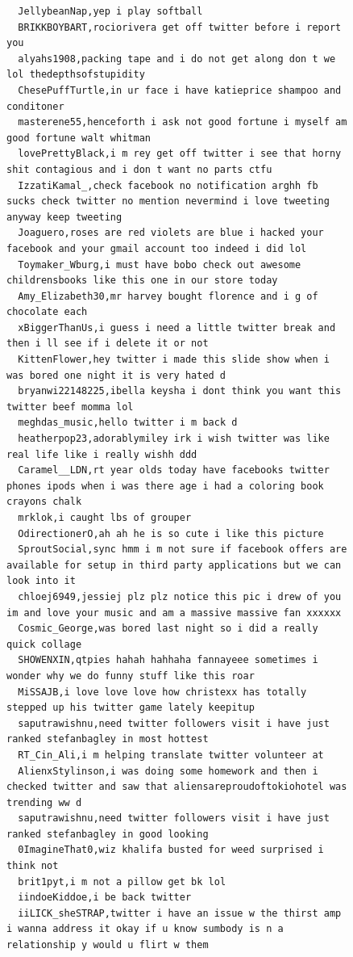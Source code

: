 \begin{figure}[htpb]
\begin{verbatim}
  JellybeanNap,yep i play softball
  BRIKKBOYBART,rociorivera get off twitter before i report you
  alyahs1908,packing tape and i do not get along don t we lol thedepthsofstupidity
  ChesePuffTurtle,in ur face i have katieprice shampoo and conditoner
  masterene55,henceforth i ask not good fortune i myself am good fortune walt whitman
  lovePrettyBlack,i m rey get off twitter i see that horny shit contagious and i don t want no parts ctfu
  IzzatiKamal_,check facebook no notification arghh fb sucks check twitter no mention nevermind i love tweeting anyway keep tweeting
  Joaguero,roses are red violets are blue i hacked your facebook and your gmail account too indeed i did lol
  Toymaker_Wburg,i must have bobo check out awesome childrensbooks like this one in our store today
  Amy_Elizabeth30,mr harvey bought florence and i g of chocolate each
  xBiggerThanUs,i guess i need a little twitter break and then i ll see if i delete it or not
  KittenFlower,hey twitter i made this slide show when i was bored one night it is very hated d
  bryanwi22148225,ibella keysha i dont think you want this twitter beef momma lol
  meghdas_music,hello twitter i m back d
  heatherpop23,adorablymiley irk i wish twitter was like real life like i really wishh ddd
  Caramel__LDN,rt year olds today have facebooks twitter phones ipods when i was there age i had a coloring book crayons chalk
  mrklok,i caught lbs of grouper
  OdirectionerO,ah ah he is so cute i like this picture
  SproutSocial,sync hmm i m not sure if facebook offers are available for setup in third party applications but we can look into it
  chloej6949,jessiej plz plz notice this pic i drew of you im and love your music and am a massive massive fan xxxxxx
  Cosmic_George,was bored last night so i did a really quick collage
  SHOWENXIN,qtpies hahah hahhaha fannayeee sometimes i wonder why we do funny stuff like this roar
  MiSSAJB,i love love love how christexx has totally stepped up his twitter game lately keepitup
  saputrawishnu,need twitter followers visit i have just ranked stefanbagley in most hottest
  RT_Cin_Ali,i m helping translate twitter volunteer at
  AlienxStylinson,i was doing some homework and then i checked twitter and saw that aliensareproudoftokiohotel was trending ww d
  saputrawishnu,need twitter followers visit i have just ranked stefanbagley in good looking
  0ImagineThat0,wiz khalifa busted for weed surprised i think not
  brit1pyt,i m not a pillow get bk lol
  iindoeKiddoe,i be back twitter
  iiLICK_sheSTRAP,twitter i have an issue w the thirst amp i wanna address it okay if u know sumbody is n a relationship y would u flirt w them

\end{verbatim}
\end{figure}
